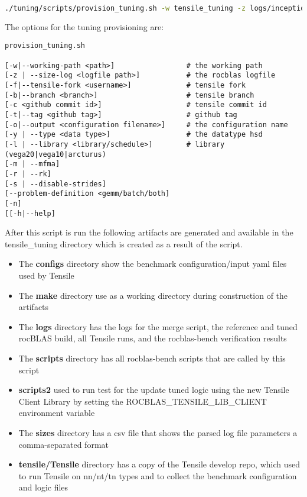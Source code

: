 \documentclass[]{article}
\begin{document}
\begin{lstlisting}[language=bash,breaklines=true]
./tuning/scripts/provision_tuning.sh -w tensile_tuning -z logs/inception-rocblas-configs_unique.log -o tf_inception.yaml -y sgemm -l vega20 
\end{lstlisting}

The options for the tuning provisioning are:

\begin{verbatim}
provision_tuning.sh 

[-w|--working-path <path>]                 # the working path
[-z | --size-log <logfile path>]           # the rocblas logfile 
[-f|--tensile-fork <username>]             # tensile fork
[-b|--branch <branch>]                     # tensile branch
[-c <github commit id>]                    # tensile commit id
[-t|--tag <github tag>]                    # github tag 
[-o|--output <configuration filename>]     # the configuration name
[-y | --type <data type>]                  # the datatype hsd
[-l | --library <library/schedule>]        # library (vega20|vega10|arcturus)
[-m | --mfma] 
[-r | --rk] 
[-s | --disable-strides] 
[--problem-definition <gemm/batch/both] 
[-n] 
[[-h|--help]

\end{verbatim}

After this script is run the following artifacts are generated and available in the tensile\_tuning directory which is created as a result of the script.

\begin{itemize}
	

 \item The \textbf{configs} directory show the benchmark configuration/input yaml files used by Tensile
 
 \item The \textbf{make} directory use as a working directory during construction of the artifacts

 \item The \textbf{logs} directory has the logs for the merge script, the reference and tuned rocBLAS build, all Tensile runs, and the rocblas-bench verification results
 
 \item The \textbf{scripts} directory has all rocblas-bench scripts that are called by this script
 
 \item \textbf{scripts2} used to run test for the update tuned logic using the new Tensile Client Library by setting the ROCBLAS\_TENSILE\_LIB\_CLIENT environment variable
 
 \item The \textbf{sizes} directory has a csv file that shows the parsed log file parameters a comma-separated format
 
 \item \textbf{tensile/Tensile} directory has a copy of the Tensile develop repo, which used to run Tensile on nn/nt/tn types and to collect the benchmark configuration and logic files
	
\end{itemize}
\end{document}
